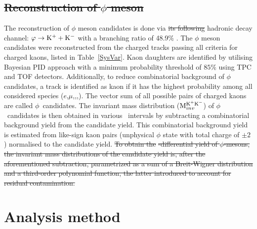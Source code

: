 \documentclass[ALICE,manyauthors]{cernphprep}
\providecommand{\DIFaddtex}[1]{{\protect\color{blue}\uwave{#1}}} %
\providecommand{\DIFdeltex}[1]{{\protect\color{red}\sout{#1}}}                      %
\providecommand{\DIFaddbegin}{} %
\providecommand{\DIFaddend}{} %
\providecommand{\DIFdelbegin}{} %
\providecommand{\DIFdelend}{} %
\providecommand{\DIFadd}[1]{\texorpdfstring{\DIFaddtex{#1}}{#1}} %
\providecommand{\DIFdel}[1]{\texorpdfstring{\DIFdeltex{#1}}{}} %
\begin{document}
\DIFdelbegin \subsection{\DIFdel{Reconstruction of $\phi$ meson}}
\addtocounter{subsection}{-1}%

\DIFdelend The reconstruction of $\phi$ meson candidates is done via \DIFdelbegin \DIFdel{its following }\DIFdelend \DIFaddbegin \DIFadd{the }\DIFaddend hadronic decay channel: $\varphi \rightarrow {\rm K}^{+} + {\rm K}^{-}$ with a branching ratio of 48.9\% \cite{Olive_2016}. The $\phi$ meson candidates were reconstructed from the charged tracks passing all criteria for charged kaons, listed in Table~\ref{SysVar}. Kaon daughters are identified by utilising Bayesian PID approach \DIFaddbegin \DIFadd{\mbox{%
\cite{Adam:2016acv} }%
}\DIFaddend with a minimum probability threshold of $85\%$ using TPC and TOF detectors. Additionally, to reduce combinatorial background of $\phi$ candidates, a track is identified as kaon if it has the highest probability among all considered species ($e$,$\mu$,\pion,\kaon,\proton). The vector sum of all possible pairs of charged kaons are called $\phi$~candidates. The invariant mass distribution (${\rm M}_{inv}^{\rm K^{+}K^{-}}$) of $\phi$~candidates is then obtained in various \pT~intervals by subtracting a combinatorial background yield from the candidate yield. This combinatorial background yield is estimated from like-sign kaon pairs (unphysical $\phi$ state with total charge of $\pm2$) normalised to the candidate yield. 
\DIFdelbegin \DIFdel{To obtain the }%
\DIFdel{-differential yield of $\phi$-mesons, the invariant mass distributions of the candidate yield is, after the aforementioned subtraction, parametrized as a sum of a Breit-Wigner distribution and a third-order polynomial function, the latter introduced to account for residual contamination.
}\DIFdelend 




\section{Analysis method}
\label{Sec:Analysis method}
\DIFdelbegin %
\end{document}
